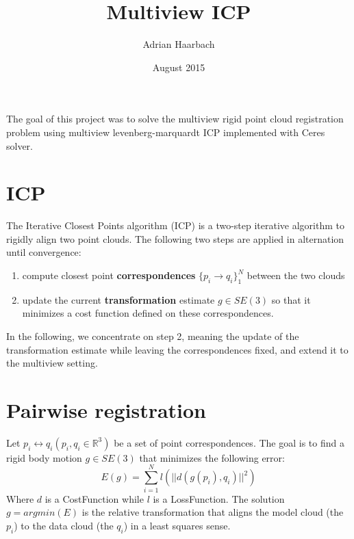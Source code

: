 \documentclass[12pt, a4paper]{article}
\title{Multiview ICP}
\author{Adrian Haarbach}
\date{August 2015}
\begin{document}
\maketitle
The goal of this project was to solve the multiview rigid point cloud registration problem using multiview levenberg-marquardt ICP implemented with Ceres solver. 

\section{ICP}
The Iterative Closest Points algorithm (ICP) \cite{besl1992method,chen1991object,zhang1994iterative} is a two-step iterative algorithm to rigidly align two point clouds. The following two steps are applied in alternation until convergence:
\begin{enumerate}
	\item compute closest point \textbf{correspondences} $\{p_i \rightarrow q_i\}_1^N$ between the two clouds
	\item update the current \textbf{transformation} estimate $g \in SE(3)$ so that it minimizes a cost function defined on these correspondences.
\end{enumerate}
In the following, we concentrate on step 2, meaning the update of the transformation estimate while leaving the correspondences fixed, and extend it to the multiview setting.

\section{Pairwise registration}
Let $p_i \leftrightarrow q_i ( p_i, q_i\in \mathbb{R}^3) $ be a set of point correspondences. The goal is to find a rigid body motion $g \in SE(3)$ that minimizes the following error:
\begin{equation}
	E(g) = \sum_{i=1}^N l(||d(g(p_i),q_i)||^2)
	\label{eq:icp}
\end{equation}
Where $d$ is a CostFunction while $l$ is a LossFunction.
The solution $g = argmin(E)$ is the relative transformation that aligns the model cloud (the $p_i$) to the data cloud (the $q_i$) in a least squares sense.
\end{document}
